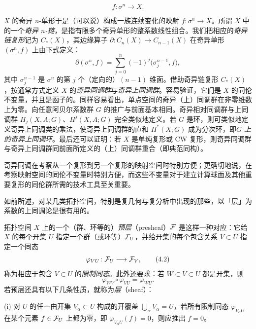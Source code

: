 \[
  f\colon\sigma^n\longrightarrow X.
\]

$X$ 的奇异 $n$-单形于是（可以说）构成一族连续变化的映射 $f\colon\sigma^n\to X$。所谓 $X$ 中的一个\emph{奇异 $n$-链}，是指有限多个奇异单形的整系数线性组合。我们把相应的\emph{奇异链复形}记为 $C_*(X)$，其边缘算子 $\partial\colon C_n(X)\to C_{n-1}(X)$ 在奇异单形 $(\sigma^n,f)$ 上由下式定义：
\begin{equation}
  \partial(\sigma^n,f)=\sum_{j=0}^{n}(-1)^j\bigl(\sigma_j^{n-1},f\bigr), \tag{4.1}
\end{equation}
其中 $\sigma_j^{n-1}$ 是 $\sigma^n$ 的第 $j$ 个（定向的）$(n-1)$ 维面。借助奇异链复形 $C_*(X)$，按通常方式定义 $X$ 的\emph{奇异同调群}与\emph{奇异上同调群}。容易验证，它们是 $X$ 的同伦不变量，并且是函子的。同样容易看出，单点空间的奇异（上）同调群在非零维数上为零。向任意阿贝尔系数群 $G$ 的推广与前面基本相同。奇异相对同调群与上同调群 $H_j(X,A;G)$、$H^j(X,A;G)$ 完全类似地定义。若 $G$ 是环，则可类似地定义奇异上同调类的乘法，使奇异上同调群的直和 $H^*(X;G)$ 成为分次环，即\emph{$G$ 上的奇异上同调环}。最后还可以证明：若 $X$ 是单纯复形或 CW 复形，则奇异同调群与奇异上同调群同前面所定义的（上）同调群重合（即典范同构）。

奇异同调在考察从一个复形到另一个复形的映射空间时特别方便；更确切地说，在考察映射空间的同伦不变量时特别方便，而这些不变量对于建立计算球面及其他重要复形的同伦群所需的技术工具至关重要。

如前所述，对某几类拓扑空间，特别是复几何与复分析中出现的那些，以「层」为系数的上同调论是很有用的。

拓扑空间 $X$ 上的一个（群、环等的）\emph{预层}（presheaf）$\mathcal{F}$ 是这样一种对应：它给 $X$ 的每个开集 $U$ 指定一个群（或环等）$\mathcal{F}_U$，并给开集的每个包含关系 $V\subset U$ 指定一个同态
\begin{equation}
  \varphi_{VU}\colon\mathcal{F}_U\longrightarrow\mathcal{F}_V, \tag{4.2}
\end{equation}
称为相应于包含 $V\subset U$ 的\emph{限制同态}。此外还要求：若 $W\subset V\subset U$ 都是开集，则
\begin{equation}
  \varphi_{WV}\circ\varphi_{VU}=\varphi_{WU}. \tag{4.3}
\end{equation}
若预层还具有以下几条性质，就称为\emph{层}（sheaf）：


(i) 对 $U$ 的任一由开集 $V_\alpha\subset U$ 构成的开覆盖 $\bigcup_\alpha V_\alpha=U$，若所有限制同态 $\varphi_{V_\alpha U}$ 在某个元素 $f\in\mathcal{F}_U$ 上都为零，即 $\varphi_{V_\alpha U}(f)=0$，则应推出 $f=0$。

